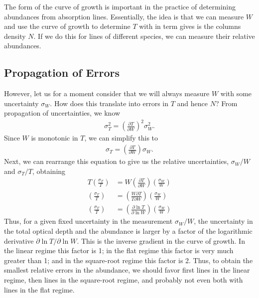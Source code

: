 The form of the curve of growth is important in the practice of determining abundances from absorption lines. Essentially, the idea is that we can measure $W$ and use the curve of growth to determine $T$ with in term gives is the columns density $N$. If we do this for lines of different species, we can measure their relative abundances.

\newslide

\subsection{Propagation of Errors}

However, let us for a moment consider that we will always measure $W$ with some uncertainty $\sigma_W$. How does this translate into errors in $T$ and hence $N$? From propagation of uncertainties, we know
\begin{align}
\sigma_T^2 = \left(\frac{\partial T}{\partial W}\right)^2\sigma_W^2.
\end{align}
Since $W$ is monotonic in $T$, we can simplify this to 
\begin{align}
\sigma_T = \left(\frac{\partial T}{\partial W}\right)\sigma_W.
\end{align}
Next, we can rearrange this equation to give us the relative uncertainties, $\sigma_W/W$ and $\sigma_T/T$, obtaining
\begin{align}
T \left(\frac{\sigma_T}{T}\right) &= W\left(\frac{\partial T}{\partial W}\right)\left(\frac{\sigma_W}{W}\right)\\
\left(\frac{\sigma_T}{T}\right) &= \left(\frac{W \partial T}{T \partial W}\right)\left(\frac{\sigma_W}{W}\right)\\
\left(\frac{\sigma_T}{T}\right) &= \left(\frac{\partial \ln T}{\partial \ln W}\right)\left(\frac{\sigma_W}{W}\right)
\end{align}
Thus, for a given fixed uncertainty in the measurement $\sigma_W/W$, the uncertainty in the total optical depth and the abundance is larger by a factor of the logarithmic derivative $\partial \ln T/\partial \ln W$. This is the inverse gradient in the curve of growth. In the linear regime this factor is 1; in the flat regime this factor is very much greater than 1; and in the square-root regime this factor is 2. Thus, to obtain the smallest relative errors in the abundance, we should favor first lines in the linear regime, then lines in the square-root regime, and probably not even both with lines in the flat regime.

